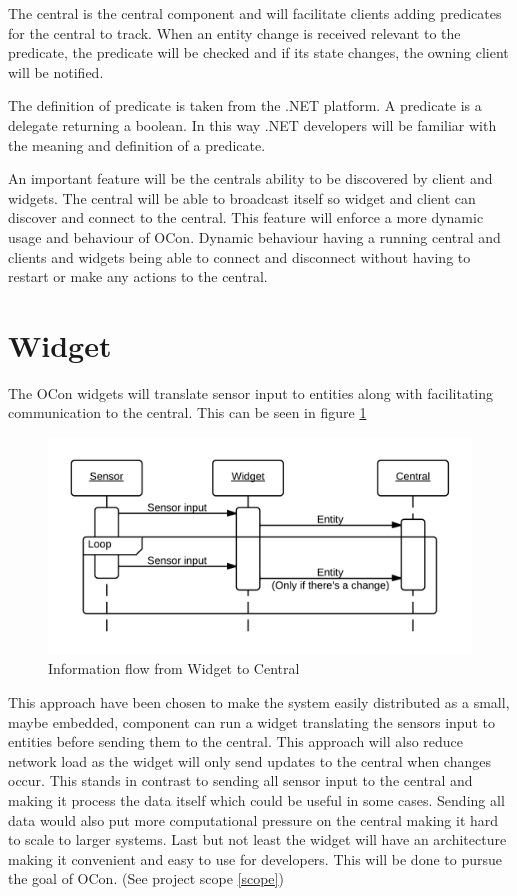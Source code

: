 \documentclass[../report.tex]{subfiles}
\begin{document}
The central is the central component and will facilitate clients adding predicates for the central to track. When an entity change is received relevant to the predicate, the predicate will be checked and if its state changes, the owning client will be notified.

The definition of predicate is taken from the .NET platform. A predicate is a delegate returning a boolean. In this way .NET developers will be familiar with the meaning and definition of a predicate.

An important feature will be the centrals ability to be discovered by client and widgets. The central will be able to broadcast itself so widget and client can discover and connect to the central. This feature will enforce a more dynamic usage and behaviour of OCon. Dynamic behaviour having a running central and clients and widgets being able to connect and disconnect without having to restart or make any actions to the central.
 
\section{Widget}

The OCon widgets will translate sensor input to entities along with facilitating communication to the central. This can be seen in figure \ref{seqwidget}

\begin{figure}[h]
\centering
\includegraphics[width=\linewidth]{sequencediagram-widget.png}
\caption{Information flow from Widget to Central}
\label{seqwidget}
\end{figure}

This approach have been chosen to make the system easily distributed as a small, maybe embedded, component can run a widget translating the sensors input to entities before sending them to the central. This approach will also reduce network load as the widget will only send updates to the central when changes occur. This stands in contrast to sending all sensor input to the central and making it process the data itself which could be useful in some cases. Sending all data would also put more computational pressure on the central making it hard to scale to larger systems. Last but not least the widget will have an architecture making it convenient and easy to use for developers. This will be done to pursue the goal of OCon. (See project scope \ref{scope}) 
\end{document}
